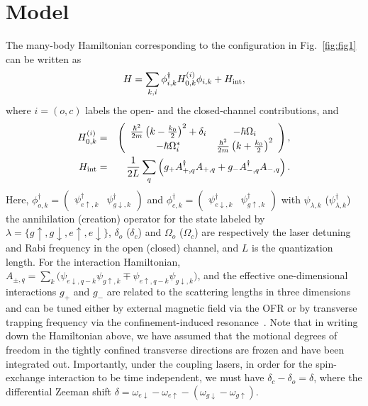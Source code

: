 \documentclass[a4paper, aps,pra, twocolumn, superscriptaddress, showpacs]{revtex4}
\begin{document}
\section{Model}
\label{sec:model}
The many-body Hamiltonian corresponding to the configuration in Fig.~\ref{fig:fig1} can be written as
\begin{equation}
  H=\sum_{k, i}\phi^\dag_{i,k} H^{(i)}_{0,k} \phi_{i,k}+H_{\rm int},
\end{equation}
where $i=(o,c)$ labels the open- and the closed-channel contributions, and
\begin{eqnarray}
H^{(i)}_{0,k}&=&\left(\begin{array}{cc}
\frac{\hbar^2}{2m}\left(k-\frac{k_0}{2}\right)^{2}+\delta_{i} & -\hbar\Omega_{i}\\
-\hbar\Omega_{i}^{*} & \frac{\hbar^2}{2m}\left(k+\frac{k_0}{2}\right)^{2}
\end{array}\right),\\ \nonumber
H_{\rm int}&=&\frac{1}{2L}\sum_q\left(g_{+}{A}_{+,q}^{\dagger}{A}_{+,q}+g_{-}{A}_{-,q}^{\dagger}{A}_{-,q}\right).
\end{eqnarray}
Here, $\phi_{o,k}^{\dagger}=\left(\begin{array}{cc} \psi_{e\uparrow, k}^{\dagger} & \psi_{g\downarrow, k}^{\dagger}\end{array}\right)$ and $\phi_{c,k}^{\dagger}=\left(\begin{array}{cc} \psi_{e\downarrow, k}^{\dagger} & \psi_{g\uparrow, k}^{\dagger}\end{array}\right)$ with $\psi_{\lambda, k}$ ($\psi_{\lambda, k}^{\dagger}$) the annihilation (creation) operator for the state labeled by $\lambda=\{g\uparrow,g\downarrow,e\uparrow,e\downarrow\}$, $\delta_o$ ($\delta_c$) and $\Omega_o$ ($\Omega_c$) are respectively the laser detuning and Rabi frequency in the open (closed) channel, and $L$ is the quantization length. For the interaction Hamiltonian, $A_{\pm,q}=\sum_k\big(\psi_{e\downarrow,q-k}\psi_{g\uparrow,k}\mp\psi_{e\uparrow,q-k}\psi_{g\downarrow,k}\big)$, and the effective one-dimensional interactions $g_{+}$ and $g_{-}$ are related to the scattering lengths in three dimensions and can be tuned either by external magnetic field via the OFR or by transverse trapping frequency via the confinement-induced resonance~\cite{zhang_kondo_2016}. Note that in writing down the Hamiltonian above, we have assumed that the motional degrees of freedom in the tightly confined transverse directions are frozen and have been integrated out. Importantly, under the coupling lasers, in order for the spin-exchange interaction to be time independent, we must have $\delta_c-\delta_o=\delta$, where the differential Zeeman shift $\delta=\omega_{e\downarrow}-\omega_{e\uparrow}-\left(\omega_{g\downarrow}-\omega_{g\uparrow}\right)$.
\end{document}
